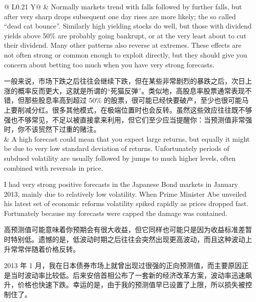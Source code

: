 \begin{bilingualtableblock}
\begin{breakabletabularx}{\textwidth}{@{} L{0.21\textwidth} Y@{}}
 & Normally markets trend with falls followed by further falls, but after very sharp drops subsequent one day rises are more likely; the so called ``dead cat bounce''. Similarly high yielding stocks do well, but those with dividend yields above 50\% are probably going bankrupt, or at the very least about to cut their dividend. Many other patterns also reverse at extremes. These effects are not often strong or common enough to exploit directly, but they should give you concern about betting too much when you have very strong forecasts.\par\medskip 一般来说，市场下跌之后往往会继续下跌，但在某些非常剧烈的暴跌之后，次日上涨的概率反而更大，这就是所谓的“死猫反弹”。类似地，高股息率股票通常表现不错，但那些股息率高到超过 50\% 的股票，很可能已经快要破产，至少也很可能马上要削减分红。很多其他模式，在极端位置时也会反转。虽然这些效应往往既不够强也不够常见，不足以被直接拿来利用，但它们至少应当提醒你：当预测值非常强时，你不该贸然下过重的赌注。 \\
\midrule
{} & A high forecast could mean that you expect large returns, but equally it might be due to very low standard deviation of returns. Unfortunately periods of subdued volatility are usually followed by jumps to much higher levels, often combined with reversals in price.\par I had very strong positive forecasts in the Japanese Bond markets in January 2013, mainly due to relatively low volatility. When Prime Minister Abe unveiled his latest set of economic reforms volatility spiked rapidly as prices dropped fast. Fortunately because my forecasts were capped the damage was contained.\par\medskip 高预测值可能意味着你预期会有很大收益，但它同样也可能只是因为收益标准差暂时特别低。遗憾的是，低波动时期之后往往会突然出现更高波动，而且这种波动上升常常伴随着价格反转。\par 2013 年 1 月，我在日本债券市场上就曾出现过很强的正向预测值，而主要原因正是当时波动率比较低。后来安倍首相公布了一套新的经济改革方案，波动率迅速飙升，价格也快速下跌。幸运的是，由于我的预测值早已设置了上限，所以损失被控制住了。 \\

\end{breakabletabularx}
\end{bilingualtableblock}
